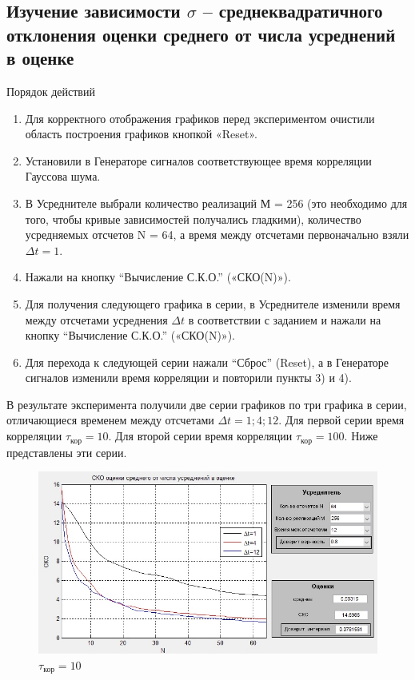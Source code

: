 \subsection[Задание 3]{Изучение зависимости $\sigma$ -- среднеквадратичного отклонения оценки среднего от числа усреднений в оценке}
Порядок действий
\begin{enumerate}
	\item Для корректного отображения графиков перед экспериментом очистили область построения графиков кнопкой «Reset».
	\item Установили в Генераторе сигналов соответствующее время корреляции Гауссова шума.
	\item В Усреднителе выбрали количество реализаций М = 256 (это необходимо для того, чтобы кривые зависимостей получались гладкими), количество усредняемых отсчетов N = 64, а время между отсчетами первоначально взяли $\Delta t = 1$.
	\item Нажали на кнопку “Вычисление С.К.О.” («СКО(N)»).
	\item Для получения следующего графика в серии, в Усреднителе изменили время между отсчетами усреднения $\Delta t$ в соответствии с заданием и нажали на кнопку “Вычисление С.К.О.” («СКО(N)»).
	\item Для перехода к следующей серии нажали “Сброс” (Reset), а в Генераторе сигналов изменили время корреляции и повторили пункты 3) и 4).
\end{enumerate}
В результате эксперимента получили две серии графиков по три графика в серии, отличающиеся временем между отсчетами $\Delta t=1; 4; 12$.
Для первой серии время корреляции $\tau_\text{кор} = 10$. Для второй серии время корреляции $\tau_\text{кор} = 100$.
Ниже представлены эти серии.
\begin{figure}[H]
	\centering
	\includegraphics[width=0.85\linewidth]{tasks/task3/realize1}
	\caption*{$\tau_\text{кор} = 10$}
\end{figure}

